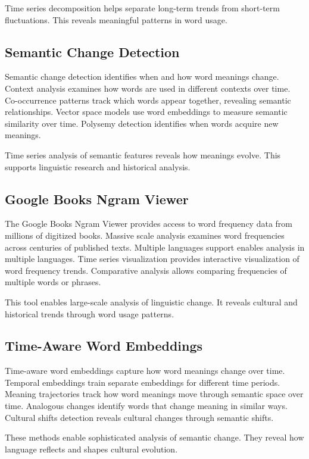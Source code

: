 Time series decomposition helps separate long-term trends from short-term fluctuations. This reveals meaningful patterns in word usage.

\subsection{Semantic Change Detection}

Semantic change detection identifies when and how word meanings change. Context analysis examines how words are used in different contexts over time. Co-occurrence patterns track which words appear together, revealing semantic relationships. Vector space models use word embeddings to measure semantic similarity over time. Polysemy detection identifies when words acquire new meanings.

Time series analysis of semantic features reveals how meanings evolve. This supports linguistic research and historical analysis.

\subsection{Google Books Ngram Viewer}

The Google Books Ngram Viewer provides access to word frequency data from millions of digitized books. Massive scale analysis examines word frequencies across centuries of published texts. Multiple languages support enables analysis in multiple languages. Time series visualization provides interactive visualization of word frequency trends. Comparative analysis allows comparing frequencies of multiple words or phrases.

This tool enables large-scale analysis of linguistic change. It reveals cultural and historical trends through word usage patterns.

\subsection{Time-Aware Word Embeddings}

Time-aware word embeddings capture how word meanings change over time. Temporal embeddings train separate embeddings for different time periods. Meaning trajectories track how word meanings move through semantic space over time. Analogous changes identify words that change meaning in similar ways. Cultural shifts detection reveals cultural changes through semantic shifts.

These methods enable sophisticated analysis of semantic change. They reveal how language reflects and shapes cultural evolution.

